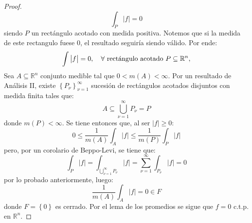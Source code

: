 \documentclass[12pt]{report}
\theoremstyle{largebreak}
\newcommand\abs[1]{\ensuremath{\big|#1\big|}}
\begin{document}
\begin{proof}
\begin{equation*}
            \int_{P}\abs{f}=0
        \end{equation*}
        siendo $P$ un rectángulo acotado con medida positiva. Notemos que si la medida de este rectangulo fuese $0$, el resultado seguiría siendo válido. Por ende:
        \begin{equation*}
            \int \abs{f}=0,\quad\forall\textup{ rectángulo acotado }P\subseteq\mathbb{R}^n,
        \end{equation*}
        Sea $A\subseteq\mathbb{R}^n$ conjunto medible tal que $0<m(A)<\infty$. Por un resultado de Análisis II, existe $\left\{P_\nu \right\}_{\nu=1}^\infty$ sucesión de rectángulos acotados disjuntos con medida finita tales que:
        \begin{equation*}
            A\subseteq \bigcup_{\nu=1}^\infty P_\nu=P
        \end{equation*}
        donde $m(P)<\infty$. Se tiene entonces que, al ser $\abs{f}\geq 0$:
        \begin{equation*}
            0\leq\frac{1}{m(A)} \int_{A}\abs{f}\leq \frac{1}{m(P)}\int_{P}\abs{f}
        \end{equation*}
        pero, por un corolario de Beppo-Levi, se tiene que:
        \begin{equation*}
            \int_{P}\abs{f}=\int_{\bigcup_{\nu=1}^\infty P_\nu}\abs{f}=\sum_{\nu=1}^\infty\int_{P_\nu}\abs{f}=0
        \end{equation*}
        por lo probado anteriormente, luego:
        \begin{equation*}
            \frac{1}{m(A)}\int_{A}\abs{f}=0\in F
        \end{equation*}
        donde $F=\left\{ 0\right\}$ es cerrado. Por el lema de los promedios se sigue que $f=0$ c.t.p. en $\mathbb{R}^n$.
    \end{proof}
\end{document}
